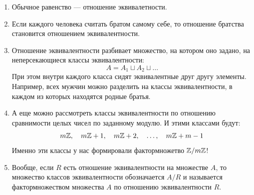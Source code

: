 \begin{enumerate}
\item Обычное равенство --- отношение эквивалетности.
\item Если каждого человека считать братом самому себе, то отношение братства становится отношением эквивалентности.
\item Отношение эквивалентности разбивает множество, на котором оно задано, на неперсекающиеся классы эквивалентности:
$$
A = A_1\sqcup A_2\sqcup\dots
$$
При этом внутри каждого класса сидят эквивалентные друг другу элементы. Например, всех мужчин можно разделить на классы эквивалентности, в каждом из которых находятся родные братья.
\item А еще можно рассмотреть классы эквивалентности по отношению сравнимости целых чисел по заданному модулю. И этими классами будут:
$$
m\mathbb Z,\quad m\mathbb Z+1,\quad m\mathbb Z+2,\quad\dots,\quad m\mathbb Z+m-1
$$
Именно эти классы у нас формировали фактормножетво $\mathbb Z/m\mathbb Z$!
\item Вообще, если $R$ есть отношение эквивалентности на множестве $A$, то множество классов эквивалентности обозначается $A/R$ и называется фактормножеством множества $A$ по отношению эквивалентности $R$.
\end{enumerate}



